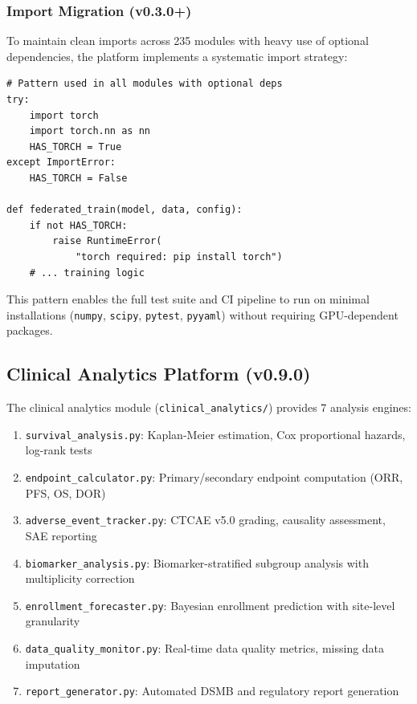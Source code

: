 \subsubsection{Import Migration (v0.3.0+)}

To maintain clean imports across 235 modules with heavy use of optional dependencies, the platform implements a systematic import strategy:

\begin{lstlisting}[caption={Conditional import pattern used across 235 modules}]
# Pattern used in all modules with optional deps
try:
    import torch
    import torch.nn as nn
    HAS_TORCH = True
except ImportError:
    HAS_TORCH = False

def federated_train(model, data, config):
    if not HAS_TORCH:
        raise RuntimeError(
            "torch required: pip install torch")
    # ... training logic
\end{lstlisting}

This pattern enables the full test suite and CI pipeline to run on minimal installations (\texttt{numpy}, \texttt{scipy}, \texttt{pytest}, \texttt{pyyaml}) without requiring GPU-dependent packages.

\subsection{Clinical Analytics Platform (v0.9.0)}
\label{sec:clinical}

The clinical analytics module (\texttt{clinical\_analytics/}) provides 7 analysis engines:

\begin{enumerate}
  \item \texttt{survival\_analysis.py}: Kaplan-Meier estimation, Cox proportional hazards, log-rank tests
  \item \texttt{endpoint\_calculator.py}: Primary/secondary endpoint computation (ORR, PFS, OS, DOR)
  \item \texttt{adverse\_event\_tracker.py}: CTCAE v5.0 grading, causality assessment, SAE reporting
  \item \texttt{biomarker\_analysis.py}: Biomarker-stratified subgroup analysis with multiplicity correction
  \item \texttt{enrollment\_forecaster.py}: Bayesian enrollment prediction with site-level granularity
  \item \texttt{data\_quality\_monitor.py}: Real-time data quality metrics, missing data imputation
  \item \texttt{report\_generator.py}: Automated DSMB and regulatory report generation
\end{enumerate}

